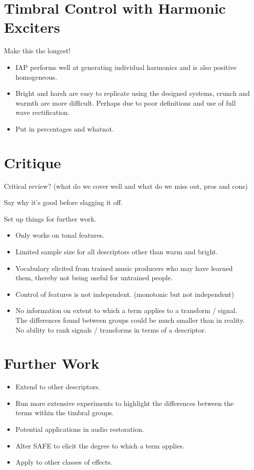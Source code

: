 \section{Timbral Control with Harmonic Exciters}
\label{sec:Conclusion-TimbralControl}
	\note
	{
		Make this the longest!

		\begin{itemize}
			\item IAP performs well at generating individual harmonics and is also positive homogeneous.
			\item Bright and harsh are easy to replicate using the designed systems, crunch and warmth are more
				difficult. Perhaps due to poor definitions and use of full wave rectification.
			\item Put in percentages and whatnot.
		\end{itemize}
	}

\section{Critique}
\label{sec:Conclusion-Critique}
	\note
	{
		Critical review? (what do we cover well and what do we miss out, pros and cons)

		Say why it's good before slagging it off.

		Set up things for further work.

		\begin{itemize}
			\item Only works on tonal features.
			\item Limited sample size for all descriptors other than warm and bright.
			\item Vocabulary elicited from trained music producers who may have learned them, thereby not being
				useful for untrained people.
			\item Control of features is not independent. (monotonic but not independent)
			\item No information on extent to which a term applies to a transform / signal. The differences
				found between groups could be much smaller than in reality. No ability to rank signals /
				transforms in terms of a descriptor.
		\end{itemize}
	}

\section{Further Work}
\label{sec:Conclusion-FurtherWork}
	\note
	{
		\begin{itemize}
			\item Extend to other descriptors.
			\item Run more extensive experiments to highlight the differences between the terms within the
				timbral groups.
			\item Potential applications in audio restoration.
			\item Alter SAFE to elicit the degree to which a term applies.
			\item Apply to other classes of effects.
		\end{itemize}
	}
